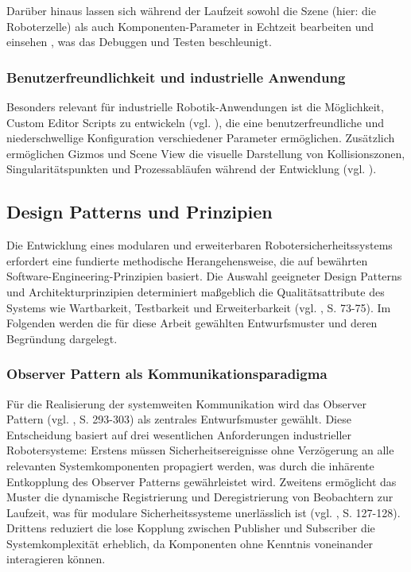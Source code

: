 Darüber hinaus lassen sich während der Laufzeit sowohl die Szene (hier: die
Roboterzelle) als auch Komponenten-Parameter in Echtzeit bearbeiten und
einsehen , was das Debuggen und Testen
beschleunigt.

\subsubsection{Benutzerfreundlichkeit und industrielle Anwendung}

Besonders relevant für industrielle Robotik-Anwendungen ist die Möglichkeit,
Custom Editor Scripts zu entwickeln (vgl.
), die eine benutzerfreundliche und
niederschwellige Konfiguration verschiedener Parameter ermöglichen. Zusätzlich
ermöglichen Gizmos und Scene View die visuelle Darstellung von Kollisionszonen,
Singularitätspunkten und Prozessabläufen während der Entwicklung (vgl.
).

\subsection{Design Patterns und Prinzipien}

Die Entwicklung eines modularen und erweiterbaren Robotersicherheitssystems
erfordert eine fundierte methodische Herangehensweise, die auf bewährten
Software-Engineering-Prinzipien basiert. Die Auswahl geeigneter Design Patterns
und Architekturprinzipien determiniert maßgeblich die Qualitätsattribute des
Systems wie Wartbarkeit, Testbarkeit und Erweiterbarkeit (vgl.
, S. 73-75). Im Folgenden werden die für diese Arbeit
gewählten Entwurfsmuster und deren Begründung dargelegt.

\subsubsection{Observer Pattern als Kommunikationsparadigma}
Für die Realisierung der systemweiten Kommunikation wird das Observer Pattern
(vgl. , S. 293-303) als zentrales Entwurfsmuster gewählt.
Diese Entscheidung basiert auf drei wesentlichen Anforderungen industrieller
Robotersysteme: Erstens müssen Sicherheitsereignisse ohne Verzögerung an alle
relevanten Systemkomponenten propagiert werden, was durch die inhärente
Entkopplung des Observer Patterns gewährleistet wird. Zweitens ermöglicht das
Muster die dynamische Registrierung und Deregistrierung von Beobachtern zur
Laufzeit, was für modulare Sicherheitssysteme unerlässlich ist (vgl.
, S. 127-128). Drittens reduziert die lose Kopplung
zwischen Publisher und Subscriber die Systemkomplexität erheblich, da
Komponenten ohne Kenntnis voneinander interagieren können.

